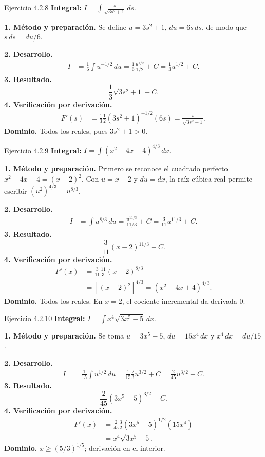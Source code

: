 \begin{examplebox}{Ejercicio 4.2.8}
\textbf{Integral:} $\displaystyle I=\int \frac{s}{\sqrt{3s^2+1}}\,ds$.

\textbf{1. Método y preparación.} Se define $u=3s^2+1$, $du=6s\,ds$, de modo que $s\,ds=du/6$.

\textbf{2. Desarrollo.}
\begin{align*}
I&=\frac16\int u^{-1/2}\,du=\frac16\frac{u^{1/2}}{1/2}+C=\frac13u^{1/2}+C.
\end{align*}
\textbf{3. Resultado.}
\[
\frac13\sqrt{3s^2+1}+C.
\]
\textbf{4. Verificación por derivación.}
\begin{align*}
F'(s)&=\frac13\frac12(3s^2+1)^{-1/2}(6s)=\frac{s}{\sqrt{3s^2+1}}.
\end{align*}
\textbf{Dominio.} Todos los reales, pues $3s^2+1>0$.
\end{examplebox}

\begin{examplebox}{Ejercicio 4.2.9}
\textbf{Integral:} $\displaystyle I=\int (x^2-4x+4)^{4/3}\,dx$.

\textbf{1. Método y preparación.} Primero se reconoce el cuadrado perfecto $x^2-4x+4=(x-2)^2$. Con $u=x-2$ y $du=dx$, la raíz cúbica real permite escribir $(u^2)^{4/3}=u^{8/3}$.

\textbf{2. Desarrollo.}
\begin{align*}
I&=\int u^{8/3}\,du=\frac{u^{11/3}}{11/3}+C=\frac3{11}u^{11/3}+C.
\end{align*}
\textbf{3. Resultado.}
\[
\frac3{11}(x-2)^{11/3}+C.
\]
\textbf{4. Verificación por derivación.}
\begin{align*}
F'(x)&=\frac3{11}\frac{11}3(x-2)^{8/3}\\&=[(x-2)^2]^{4/3}=(x^2-4x+4)^{4/3}.
\end{align*}
\textbf{Dominio.} Todos los reales. En $x=2$, el cociente incremental da derivada $0$.
\end{examplebox}

\begin{examplebox}{Ejercicio 4.2.10}
\textbf{Integral:} $\displaystyle I=\int x^4\sqrt{3x^5-5}\,dx$.

\textbf{1. Método y preparación.} Se toma $u=3x^5-5$, $du=15x^4\,dx$ y $x^4\,dx=du/15$.

\textbf{2. Desarrollo.}
\begin{align*}
I&=\frac1{15}\int u^{1/2}\,du=\frac1{15}\frac23u^{3/2}+C=\frac2{45}u^{3/2}+C.
\end{align*}
\textbf{3. Resultado.}
\[
\frac2{45}(3x^5-5)^{3/2}+C.
\]
\textbf{4. Verificación por derivación.}
\begin{align*}
F'(x)&=\frac2{45}\frac32(3x^5-5)^{1/2}(15x^4)\\&=x^4\sqrt{3x^5-5}.
\end{align*}
\textbf{Dominio.} $x\ge(5/3)^{1/5}$; derivación en el interior.
\end{examplebox}

